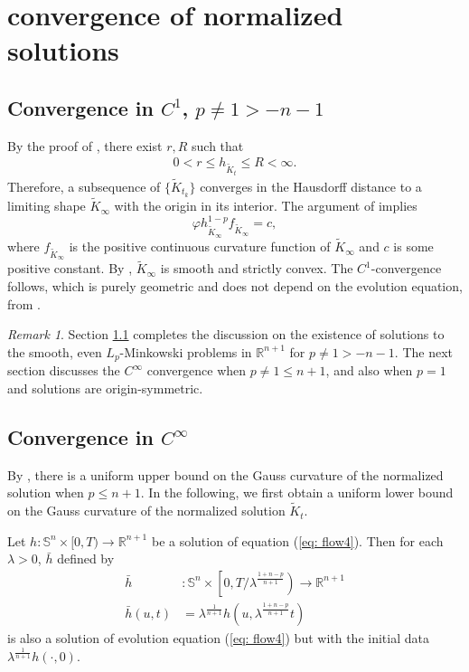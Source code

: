 \documentclass{amsart}
\theoremstyle{definition}
\theoremstyle{remark}
\newtheorem{remark}[theorem]{Remark}
\numberwithin{equation}{section}
\begin{document}
\section{convergence of normalized solutions}\label{sec: nor conv}
\subsection{Convergence in $C^{1}$, $p\neq 1>-n-1$}\label{sec}
By the proof of \cite[Corollary 7.5]{Ivaki 2014-gauss}, there exist $r,R$ such that
\begin{align}\label{ratio}
0<r\leq h_{\tilde{K}_t}\leq R<\infty.
\end{align}
Therefore, a subsequence of $\{\tilde{K}_{t_k}\}$ converges in the Hausdorff distance to a limiting shape $\tilde{K}_{\infty}$ with the origin in its interior. The argument of \cite[Section 8.1]{Ivaki 2014-gauss} implies  $$\varphi h_{\tilde{K}_{\infty}}^{1-p}f_{\tilde{K}_{\infty}}=c,$$ where $f_{\tilde{K}_{\infty}}$ is the positive continuous curvature function of $\tilde{K}_{\infty}$ and $c$ is some positive constant. By \cite[Fact 8.1]{Ivaki 2014-gauss}, $\tilde{K}_{\infty}$  is smooth and strictly convex. The $C^1$-convergence follows, which is purely geometric and does not depend on the evolution equation, from \cite[Lemma 13]{Andrews 1997}.
\begin{remark}\label{rem}
Section \ref{sec} completes the discussion on the existence of solutions to the smooth, even $L_p$-Minkowski problems in $\mathbb{R}^{n+1}$ for $p\neq 1>-n-1.$ The next section discusses  the $C^{\infty}$ convergence when $p\neq1\leq n+1$, and also when $p=1$ and solutions are origin-symmetric.
\end{remark}

\subsection{Convergence in $C^{\infty}$}

By \cite[Lemma 9.2]{Ivaki 2014-gauss}, there is a uniform upper bound on the Gauss curvature of the normalized solution when $p\leq n+1.$
In the following, we first obtain a uniform lower bound on the Gauss curvature of the normalized solution $\tilde{K}_t$.


Let $h:\mathbb{S}^{n}\times[0,T)\to\mathbb{R}^{n+1}$ be a solution of equation (\ref{eq: flow4}). Then for each $\lambda >0$, $\bar{h}$ defined by
\begin{align*}
\bar{h}&:\mathbb{S}^{n}\times\left[0,T/\lambda^{\frac{1+n-p}{n+1}}\right)\to\mathbb{R}^{n+1}\\
\bar{h}(u,t)&=\lambda^{\frac{1}{n+1}} h\left(u,\lambda^{\frac{1+n-p}{n+1}}t\right)
\end{align*}
is also a solution of evolution equation (\ref{eq: flow4}) but with the initial data $\lambda^{\frac{1}{n+1}} h\left(\cdot,0\right).$
\end{document}
